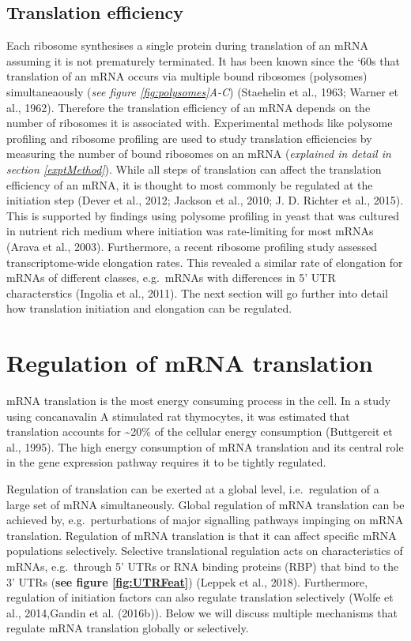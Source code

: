 \documentclass[12pt,openany]{book}
\begin{document}
\subsection{Translation efficiency} \label{transEff}

Each ribosome synthesises a single protein during translation of an mRNA
assuming it is not prematurely terminated. It has been known since the
`60s that translation of an mRNA occurs via multiple bound ribosomes
(polysomes) simultaneaously (\emph{see figure \ref{fig:polysomes}A-C})
(Staehelin et al., 1963; Warner et al., 1962). Therefore the translation
efficiency of an mRNA depends on the number of ribosomes it is
associated with. Experimental methods like polysome profiling and
ribosome profiling are used to study translation efficiencies by
measuring the number of bound ribosomes on an mRNA (\emph{explained in
detail in section \ref{exptMethod}}). While all steps of translation can
affect the translation efficiency of an mRNA, it is thought to most
commonly be regulated at the initiation step (Dever et al., 2012;
Jackson et al., 2010; J. D. Richter et al., 2015). This is supported by
findings using polysome profiling in yeast that was cultured in nutrient
rich medium where initiation was rate-limiting for most mRNAs (Arava et
al., 2003). Furthermore, a recent ribosome profiling study assessed
transcriptome-wide elongation rates. This revealed a similar rate of
elongation for mRNAs of different classes, e.g.~mRNAs with differences
in 5' UTR characterstics (Ingolia et al., 2011). The next section will
go further into detail how translation initiation and elongation can be
regulated. \newline
\section{Regulation of mRNA translation} \label{regmRNA}

mRNA translation is the most energy consuming process in the cell. In a
study using concanavalin A stimulated rat thymocytes, it was estimated
that translation accounts for \textasciitilde{}20\% of the cellular
energy consumption (Buttgereit et al., 1995). The high energy
consumption of mRNA translation and its central role in the gene
expression pathway requires it to be tightly regulated.

Regulation of translation can be exerted at a global level,
i.e.~regulation of a large set of mRNA simultaneously. Global regulation
of mRNA translation can be achieved by, e.g.~perturbations of major
signalling pathways impinging on mRNA translation. Regulation of mRNA
translation is that it can affect specific mRNA populations selectively.
Selective translational regulation acts on characteristics of mRNAs,
e.g.~through 5' UTRs or RNA binding proteins (RBP) that bind to the 3'
UTRs (\textbf{see figure \ref{fig:UTRFeat}}) (Leppek et al., 2018).
Furthermore, regulation of initiation factors can also regulate
translation selectively (Wolfe et al., 2014,Gandin et al. (2016b)).
Below we will discuss multiple mechanisms that regulate mRNA translation
globally or selectively.
\end{document}
